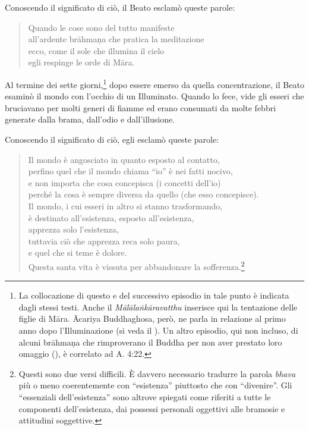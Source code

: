 Conoscendo il significato di ciò, il Beato esclamò queste parole:


\begin{quote}
Quando le cose sono del tutto manifeste \\
all’ardente brāhmaṇa che pratica la meditazione \\
ecco, come il sole che illumina il cielo \\
egli respinge le orde di Māra.
\end{quote}



Al termine dei sette giorni,\footnote{La collocazione di questo e del successivo episodio in tale punto è indicata dagli stessi testi. Anche il \emph{Mālālaṅkāravatthu} inserisce qui la tentazione delle figlie di Māra. Ācariya Buddhaghosa, però, ne parla in relazione al primo anno dopo l’Illuminazione (si veda il \hyperlink{cap-04-La-diffusione-del-Dhamma#pag70}{}). Un altro episodio, qui non incluso, di alcuni brāhmaṇa che rimproverano il Buddha per non aver prestato loro omaggio (\hyperlink{cap-09-La-fine-del-primo-ventennio#pag137}{}), è correlato ad A. 4:22.} dopo essere emerso da
quella concentrazione, il Beato esaminò il mondo con l’occhio di un
Illuminato. Quando lo fece, vide gli esseri che bruciavano per molti
generi di fiamme ed erano consumati da molte febbri generate dalla
brama, dall’odio e dall’illusione.


Conoscendo il significato di ciò, egli esclamò queste parole:


\begin{quote}
Il mondo è angosciato in quanto esposto al contatto, \\
perfino quel che il mondo chiama “io” è nei fatti nocivo, \\
e non importa che cosa concepisca (i concetti dell’io) \\
perché la cosa è sempre diversa da quello (che esso concepisce). \\
Il mondo, i cui esseri in altro si stanno trasformando, \\
è destinato all’esistenza, esposto all’esistenza, \\
apprezza solo l’esistenza, \\
tuttavia ciò che apprezza reca solo paura, \\
e quel che si teme è dolore. \\
Questa santa vita è vissuta per abbandonare la
sofferenza.\footnote{Questi sono due versi difficili. È davvero necessario tradurre la parola \emph{bhava} più o meno coerentemente con “esistenza” piuttosto che con “divenire”. Gli “essenziali dell’esistenza” sono altrove spiegati come riferiti a tutte le componenti dell’esistenza, dai possessi personali oggettivi alle bramosie e attitudini soggettive.}
\end{quote}

